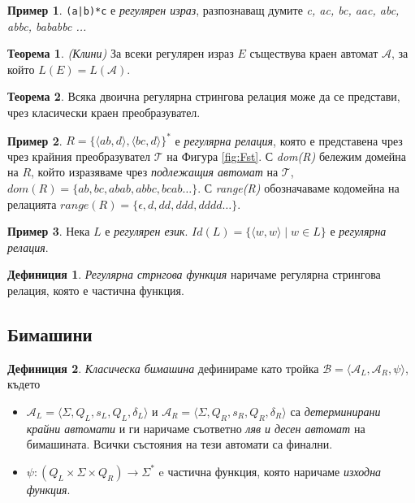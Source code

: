 \documentclass[12pt, oneside]{article}
\theoremstyle{definition}
\newtheorem{definition}{Дефиниция}[section]
\newtheorem{theorem}{Теорема}[section]
\newtheorem{example}{Пример}[section]
\begin{document}
\begin{example}
	\verb/(a|b)*c/ е \emph{регулярен израз}, разпознаващ думите \emph{c, ac, bc, aac, abc, abbc, bababbc ...}
\end{example}

\begin{theorem}{\emph{(Клини)}}
	За всеки регулярен израз \( E \) съществува краен автомат \( \mathcal{A} \), за който \( L(E) = L(\mathcal{A})\).
\end{theorem}

\begin{theorem}
	Всяка двоична регулярна стрингова релация може да се представи, чрез класически краен преобразувател.
\end{theorem}

\begin{example}
	\( R = \{ \langle ab, d \rangle, \langle bc, d \rangle \}^* \) е \emph{регулярна релация}, която е представена чрез чрез крайния преобразувател \(\mathcal{T}\) на Фигура \ref{fig:Fst}. \newline
	С \emph{dom(R)} бележим домейна на \(R\), който изразяваме чрез \emph{подлежащия автомат} на \( \mathcal{T} \), \( dom(R) =  \{ ab, bc, abab, abbc, bcab \dots \} \). С \emph{range(R)} обозначаваме кодомейна на релацията \( range(R) =  \{ \epsilon, d, dd, ddd, dddd \dots \} \).
\end{example}

\begin{example}
	Нека \(L\) е \emph{регулярен език}. \( Id(L) = \{ \langle w, w \rangle \mid w \in L \}\) е \emph{регулярна релация}.
\end{example}

\begin{definition}
	\emph{Регулярна стрнгова функция} наричаме регулярна стрингова релация, която е частична функция. 
\end{definition}

\subsection{Бимашини}

\begin{definition}
	 \emph{Класическа бимашина} дефинираме като тройка \( \mathcal{B} = \langle \mathcal{A}_L, \mathcal{A}_R, \psi \rangle \), където

	\begin{itemize}
		\item \( \mathcal{A}_L = \langle \Sigma, Q_L, s_L, Q_L, \delta_L \rangle \) и \( \mathcal{A}_R = \langle \Sigma, Q_R, s_R, Q_R, \delta_R \rangle \) са \emph{детерминирани крайни автомати} и ги наричаме съответно \emph{ляв и десен автомат} на бимашината. Всички състояния на тези автомати са финални.
		\item \( \psi:(Q_L \times \Sigma \times Q_R) \to \Sigma^* \) e частична функция, която наричаме \emph{изходна функция}.
	\end{itemize}
\end{definition}
\end{document}
